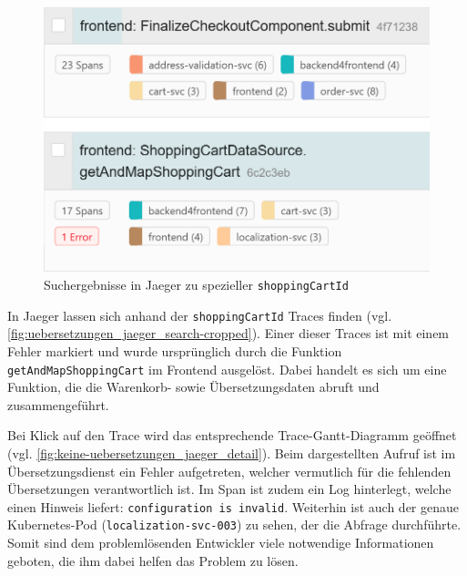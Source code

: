 \begin{figure}
\centering
\includegraphics[width=\linewidth]{img/05_ergebnis/keine-uebersetzungen_jaeger_search-cropped.png}
\caption{Suchergebnisse in Jaeger zu spezieller \texttt{shoppingCartId}}
\label{fig:uebersetzungen_jaeger_search-cropped}
\end{figure}

In Jaeger lassen sich anhand der \texttt{shopping\-Cart\-Id} Traces finden (vgl. \autoref{fig:uebersetzungen_jaeger_search-cropped}). Einer dieser Traces ist mit einem Fehler markiert und wurde ursprünglich durch die Funktion \texttt{getAndMapShoppingCart} im Frontend ausgelöst. Dabei handelt es sich um eine Funktion, die die Warenkorb- sowie Übersetzungsdaten abruft und zusammengeführt.

Bei Klick auf den Trace wird das entsprechende Trace-Gantt-Diagramm geöffnet (vgl. \autoref{fig:keine-uebersetzungen_jaeger_detail}). Beim dargestellten Aufruf ist im Übersetzungsdienst ein Fehler aufgetreten, welcher vermutlich für die fehlenden Übersetzungen verantwortlich ist. Im Span ist zudem ein Log hinterlegt, welche einen Hinweis liefert: \texttt{configuration is invalid}. Weiterhin ist auch der genaue Kubernetes-Pod (\texttt{localization-svc-003}) zu sehen, der die Abfrage durchführte. Somit sind dem problemlösenden Entwickler viele notwendige Informationen geboten, die ihm dabei helfen das Problem zu lösen.

